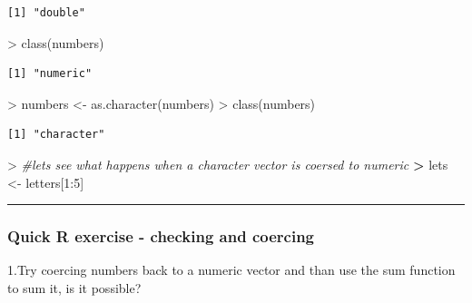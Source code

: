 \documentclass[
]{book}
\newenvironment{Shaded}{\begin{snugshade}}{\end{snugshade}}
\newcommand{\CommentTok}[1]{\textcolor[rgb]{0.56,0.35,0.01}{\textit{#1}}}
\newcommand{\DecValTok}[1]{\textcolor[rgb]{0.00,0.00,0.81}{#1}}
\newcommand{\ErrorTok}[1]{\textcolor[rgb]{0.64,0.00,0.00}{\textbf{#1}}}
\newcommand{\FunctionTok}[1]{\textcolor[rgb]{0.00,0.00,0.00}{#1}}
\newcommand{\NormalTok}[1]{#1}
\newcommand{\OtherTok}[1]{\textcolor[rgb]{0.56,0.35,0.01}{#1}}
\newcommand{\SpecialCharTok}[1]{\textcolor[rgb]{0.00,0.00,0.00}{#1}}
\theoremstyle{definition}
\theoremstyle{definition}
\theoremstyle{definition}
\theoremstyle{definition}
\theoremstyle{remark}
\begin{document}
\begin{verbatim}
[1] "double"
\end{verbatim}

\begin{Shaded}
\begin{Highlighting}[]
\SpecialCharTok{\textgreater{}} \FunctionTok{class}\NormalTok{(numbers)}
\end{Highlighting}
\end{Shaded}

\begin{verbatim}
[1] "numeric"
\end{verbatim}

\begin{Shaded}
\begin{Highlighting}[]
\SpecialCharTok{\textgreater{}}\NormalTok{ numbers }\OtherTok{\textless{}{-}} \FunctionTok{as.character}\NormalTok{(numbers)}
\SpecialCharTok{\textgreater{}} \FunctionTok{class}\NormalTok{(numbers)}
\end{Highlighting}
\end{Shaded}

\begin{verbatim}
[1] "character"
\end{verbatim}

\begin{Shaded}
\begin{Highlighting}[]
\SpecialCharTok{\textgreater{}} \CommentTok{\#lets see what happens when a character vector is coersed to numeric}
\ErrorTok{\textgreater{}}\NormalTok{ lets }\OtherTok{\textless{}{-}}\NormalTok{ letters[}\DecValTok{1}\SpecialCharTok{:}\DecValTok{5}\NormalTok{]}
\end{Highlighting}
\end{Shaded}

\begin{center}\rule{0.5\linewidth}{0.5pt}\end{center}

\hypertarget{quick-r-exercise---checking-and-coercing}{%
\subsubsection*{\texorpdfstring{\textbf{Quick R exercise - checking and coercing}}{Quick R exercise - checking and coercing}}\label{quick-r-exercise---checking-and-coercing}}

1.Try coercing numbers back to a numeric vector and than use the sum function to sum it, is it possible?
\end{document}
